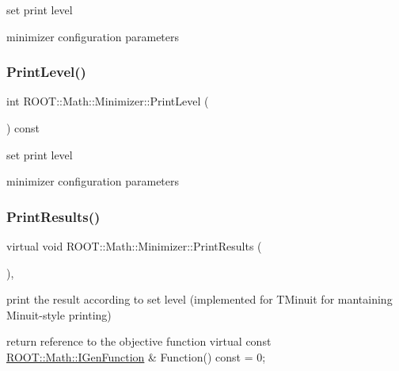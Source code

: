 set print level 

minimizer configuration parameters \mbox{\label{classROOT_1_1Math_1_1Minimizer_ae6c76dc2f3073f19edf22561866c2f9c}} 
\subsubsection{\texorpdfstring{PrintLevel()}{PrintLevel()}\hspace{0.1cm}{\footnotesize\ttfamily [3/3]}}
{\footnotesize\ttfamily int R\+O\+O\+T\+::\+Math\+::\+Minimizer\+::\+Print\+Level (\begin{DoxyParamCaption}{ }\end{DoxyParamCaption}) const\hspace{0.3cm}{\ttfamily [inline]}}



set print level 

minimizer configuration parameters \mbox{\label{classROOT_1_1Math_1_1Minimizer_aea1c5d69c6a1c1f2cf4d17a523862560}} 
\subsubsection{\texorpdfstring{PrintResults()}{PrintResults()}\hspace{0.1cm}{\footnotesize\ttfamily [1/3]}}
{\footnotesize\ttfamily virtual void R\+O\+O\+T\+::\+Math\+::\+Minimizer\+::\+Print\+Results (\begin{DoxyParamCaption}{ }\end{DoxyParamCaption})\hspace{0.3cm}{\ttfamily [inline]}, {\ttfamily [virtual]}}



print the result according to set level (implemented for T\+Minuit for mantaining Minuit-\/style printing) 

return reference to the objective function virtual const \mbox{\hyperlink{namespaceROOT_1_1Math_afe6400b4439b79d54c41fb9f5c5af171}{R\+O\+O\+T\+::\+Math\+::\+I\+Gen\+Function}} \& Function() const = 0; 

